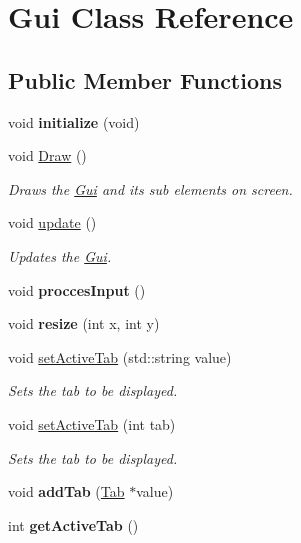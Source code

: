 \hypertarget{class_gui}{}\section{Gui Class Reference}
\label{class_gui}
\subsection*{Public Member Functions}
\begin{DoxyCompactItemize}
\item 
\mbox{\label{class_gui_a2a20c5db0b4e9a337f07a822a0e5d952}} 
void {\bfseries initialize} (void)
\item 
void \hyperlink{class_gui_acf4f1d3954d40aec3bc0ab4652b6a060}{Draw} ()
\begin{DoxyCompactList}\small\item\em Draws the \hyperlink{class_gui}{Gui} and its sub elements on screen. \end{DoxyCompactList}\item 
void \hyperlink{class_gui_af057adcdd96ee8b8021519d68ed9042e}{update} ()
\begin{DoxyCompactList}\small\item\em Updates the \hyperlink{class_gui}{Gui}. \end{DoxyCompactList}\item 
\mbox{\label{class_gui_a59ceaded048a18563961252e3be66436}} 
void {\bfseries procces\+Input} ()
\item 
\mbox{\label{class_gui_a0bafcd9e94ade1deec435ca998e9b749}} 
void {\bfseries resize} (int x, int y)
\item 
void \hyperlink{class_gui_a30be0666694e35dbcc4f6473e02b6fdc}{set\+Active\+Tab} (std\+::string value)
\begin{DoxyCompactList}\small\item\em Sets the tab to be displayed. \end{DoxyCompactList}\item 
void \hyperlink{class_gui_ae192d588b4f3cfef2ed9772d74689465}{set\+Active\+Tab} (int tab)
\begin{DoxyCompactList}\small\item\em Sets the tab to be displayed. \end{DoxyCompactList}\item 
\mbox{\label{class_gui_a55e8bca58c3c35f3a3c90d33ca112998}} 
void {\bfseries add\+Tab} (\hyperlink{class_tab}{Tab} $\ast$value)
\item 
\mbox{\label{class_gui_ad5dd19ab9b458dc56602ad2c1a13919e}} 
int {\bfseries get\+Active\+Tab} ()
\end{DoxyCompactItemize}

